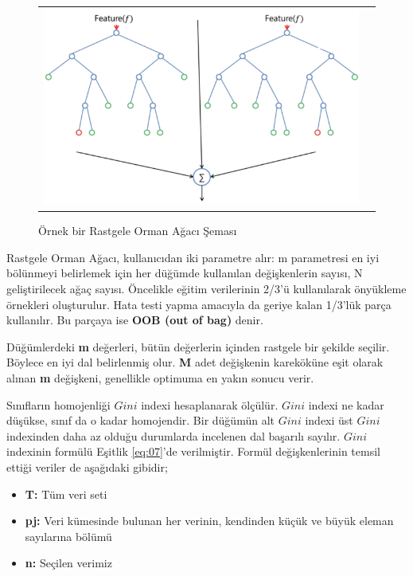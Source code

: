 \documentclass[conference]{IEEEtran}
\begin{document}
\begin{figure}[!h]
	\centering%
	\begin{center}
		\begin{tabular}{cc}%
			\includegraphics[scale=0.45]{pictures/pic_07.png}&%
		\end{tabular}%
	\end{center}
	\caption{Örnek bir Rastgele Orman Ağacı Şeması\cite{20}}%
	\label{fig:07}
\end{figure}

\quad Rastgele Orman Ağacı, kullanıcıdan iki parametre alır: m parametresi en iyi bölünmeyi belirlemek için her düğümde kullanılan değişkenlerin sayısı, N geliştirilecek ağaç sayısı. Öncelikle eğitim verilerinin 2/3'ü kullanılarak önyükleme örnekleri oluşturulur. Hata testi yapma amacıyla da geriye kalan 1/3'lük parça kullanılır. Bu parçaya ise \textbf{OOB (out of bag)} denir\cite{21}.

\quad Düğümlerdeki \textbf{m} değerleri, bütün değerlerin içinden rastgele bir şekilde seçilir. Böylece en iyi dal belirlenmiş olur. \textbf{M} adet değişkenin kareköküne eşit olarak alınan \textbf{m} değişkeni, genellikle optimuma en yakın sonucu verir\cite{21}.

\quad Sınıfların homojenliği $Gini$ indexi hesaplanarak ölçülür. $Gini$ indexi ne kadar düşükse, sınıf da o kadar homojendir. Bir düğümün alt $Gini$ indexi üst $Gini$ indexinden daha az olduğu durumlarda incelenen dal başarılı sayılır\cite{21}. $Gini$ indexinin formülü Eşitlik \ref{eq:07}'de verilmiştir. Formül değişkenlerinin temsil ettiği veriler de aşağıdaki gibidir;

\begin{itemize}
\item \textbf{T:} Tüm veri seti
\item \textbf{pj:} Veri kümesinde bulunan her verinin, kendinden küçük ve büyük eleman sayılarına bölümü
\item \textbf{n:} Seçilen verimiz
\end{itemize}
\end{document}
